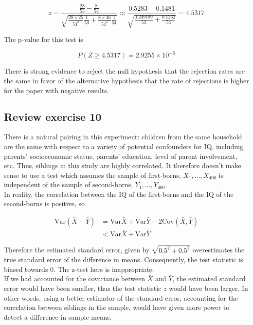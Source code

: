 \documentclass[11pt]{article}
\newcommand{\pr}{P} %
\newcommand{\var}{\textrm{Var}}
\newcommand{\cov}{\textrm{Cov}}
\begin{document}
$$z = \frac{\frac{28}{53} - \frac{8}{54}}{\sqrt{ \frac{28\times25}{53^2}\frac{1}{53} + \frac{8\times46}{54^2}\frac{1}{54}}} \approx \frac{ 0.5283 - 0.1481}{\sqrt{ \frac{ 0.249199}{53} + \frac{ 0.1262}{54}}} = 4.5317$$

The p-value for this test is

$$\pr(Z \geq 4.5317) = 2.9255 \times 10^{-6}$$

There is strong evidence to reject the null hypothesis that the rejection rates are the same in favor of the alternative hypothesis that the rate of rejections is higher for the paper with negative results.


\subsection*{Review exercise 10} %
There is a natural pairing in this experiment: children from the same household are the same with respect to a variety of potential confounders for IQ, including parents' socioeconomic status, parents' education, level of parent involvement, etc.  Thus, siblings in this study are highly correlated.  It therefore doesn't make sense to use a test which assumes the sample of first-borns, $X_1, \dots, X_{400}$ is independent of the sample of second-borns, $Y_1, \dots, Y_{400}$.  \\

In reality, the correlation between the IQ of the first-borns and the IQ of the second-borns is positive, so

\begin{align*}
\var(\bar{X} - \bar{Y}) &= \var{\bar{X}} + \var{\bar{Y}} - 2\cov(\bar{X},\bar{Y}) \\
&< \var{\bar{X}} + \var{\bar{Y}} 
\end{align*}

Therefore the estimated standard error, given by $\sqrt{0.5^2 + 0.5^2}$ overestimates the true standard error of the difference in means.  Consequently, the test statistic is biased towards $0$.  The z-test here is inappropriate. \\

If we had accounted for the covariance between $\bar{X}$ and $\bar{Y}$, the estimated standard error would have been smaller, thus the test statistic $z$ would have been larger.  In other words, using a better estimator of the standard error, accounting for the correlation between siblings in the sample, would have given more power to detect a difference in sample means.
\end{document}
